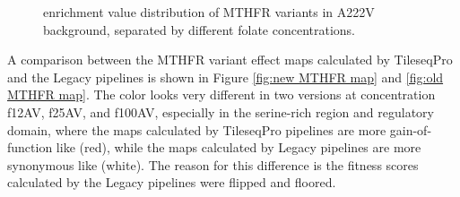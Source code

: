\documentclass{article}
\begin{document}
\begin{figure}[H]%
    \centering
    \qquad
    \qquad
    \qquad
    \caption{enrichment value distribution of MTHFR variants in A222V background, separated by different folate concentrations.}%
    \label{fig:enrichment MTHFR}%
\end{figure}



A comparison between the MTHFR variant effect maps calculated by TileseqPro and the Legacy pipelines is shown in Figure \ref{fig:new MTHFR map} and \ref{fig:old MTHFR map}. The color looks very different in two versions at concentration f12AV, f25AV, and f100AV, especially in the serine-rich region and regulatory domain, where the maps calculated by TileseqPro pipelines are more gain-of-function like (red), while the maps calculated by Legacy pipelines are more synonymous like (white). The reason for this difference is the fitness scores calculated by the Legacy pipelines were flipped and floored.
\end{document}
